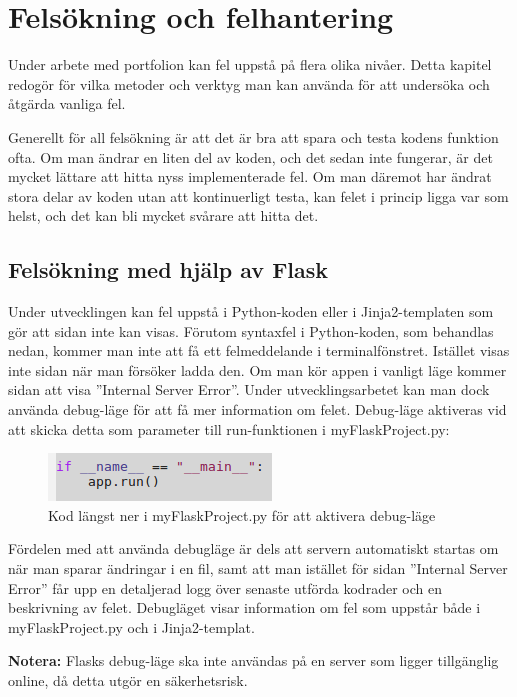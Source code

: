 

\section{Felsökning och felhantering}

Under arbete med portfolion kan fel uppstå på flera olika nivåer. Detta kapitel redogör för vilka metoder och verktyg man kan använda för att undersöka och åtgärda vanliga fel.

Generellt för all felsökning är att det är bra att spara och testa kodens funktion ofta. Om man ändrar en liten del av koden, och det sedan inte fungerar, är det mycket lättare att hitta nyss implementerade fel. Om man däremot har ändrat stora delar av koden utan att kontinuerligt testa, kan felet i princip ligga var som helst, och det kan bli mycket svårare att hitta det.


\subsection{Felsökning med hjälp av Flask}
Under utvecklingen kan fel uppstå i Python-koden eller i Jinja2-templaten som gör att sidan inte kan visas. Förutom syntaxfel i Python-koden, som behandlas nedan, kommer man inte att få ett felmeddelande i terminalfönstret. Istället visas inte sidan när man försöker ladda den. Om man kör appen i vanligt läge kommer sidan att visa ''Internal Server Error''. Under utvecklingsarbetet kan man dock använda debug-läge för att få mer information om felet. Debug-läge aktiveras vid att skicka detta som parameter till run-funktionen i myFlaskProject.py:

\begin{figure}
  \centering
  \includegraphics{debugmode}
  \caption{Kod längst ner i myFlaskProject.py för att aktivera debug-läge}
\end{figure}


Fördelen med att använda debugläge är dels att servern automatiskt startas om när man sparar ändringar i en fil, samt att man istället för sidan ''Internal Server Error'' får upp en detaljerad logg över senaste utförda kodrader och en beskrivning av felet.
Debugläget visar information om fel som uppstår både i myFlaskProject.py och i Jinja2-templat.

\textbf{Notera:} Flasks debug-läge ska inte användas på en server som ligger tillgänglig online, då detta utgör en säkerhetsrisk.

